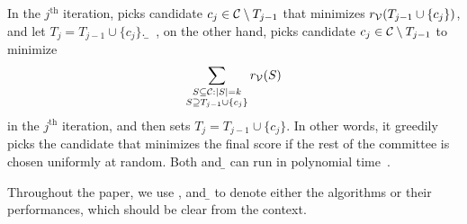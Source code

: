 In the $j^{\text{th}}$ iteration, \g{} picks candidate $c_j \in \mathcal{C} \setminus T_{j - 1}$ that minimizes $r_{\mathcal{V}}(T_{j - 1} \cup \{c_j\})$, and let $T_j = T_{j - 1} \cup \{c_j\}$. \b{}~\cite{Banzhaf,Heuristics}, on the other hand, picks candidate $c_j \in \mathcal{C} \setminus T_{j - 1}$ to minimize
\[
\sum_{\substack{S \subseteq \mathcal{C}: |S| = k \\ S \supseteq T_{j - 1} \cup \{c_j\}}} r_{\mathcal{V}}(S)
\]
in the $j^{\text{th}}$ iteration, and then sets $T_j = T_{j - 1} \cup \{c_j\}$. In other words, it greedily picks the candidate that minimizes the final score if the rest of the committee is chosen uniformly at random. Both \g{} and \b{} can run in polynomial time~\cite{Heuristics}.

Throughout the paper, we use \rand{}, \g{} and \b{} to denote either the algorithms or their performances, which should be clear from the context.
